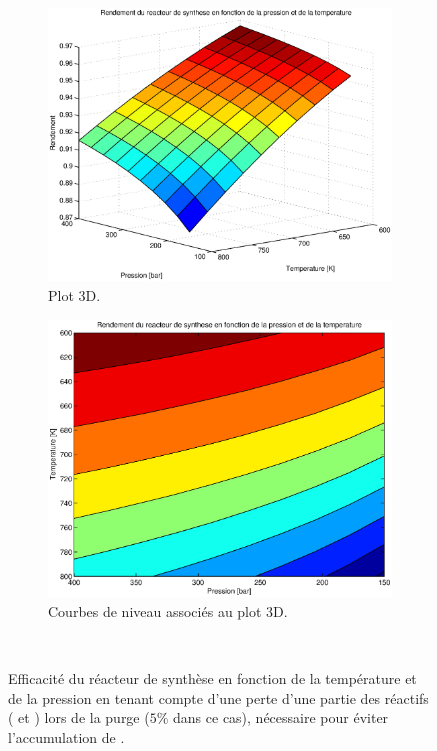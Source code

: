 \begin{figure}
	\centering
	\begin{subfigure}[b]{1\textwidth}
		\includegraphics[scale=0.7]{../tache2/img/efficienceSyntheseS.eps}
		\caption{Plot 3D.}
		\label{fig:efficienceS}
	\end{subfigure}
	\begin{subfigure}[b]{0.8\textwidth}
		\includegraphics[scale=0.6]{../tache2/img/efficienceSyntheseC.eps}
		\caption{Courbes de niveau associés au plot 3D.}
		\label{fig:efficienceC}
	\end{subfigure} \\
	\caption{Efficacité du réacteur de synthèse en fonction de la température 
		et de la pression en tenant compte d'une perte d'une partie des 
		réactifs ( et ) lors de la purge ($5\%$ dans ce cas),
		nécessaire pour éviter l'accumulation de .}
\end{figure}

